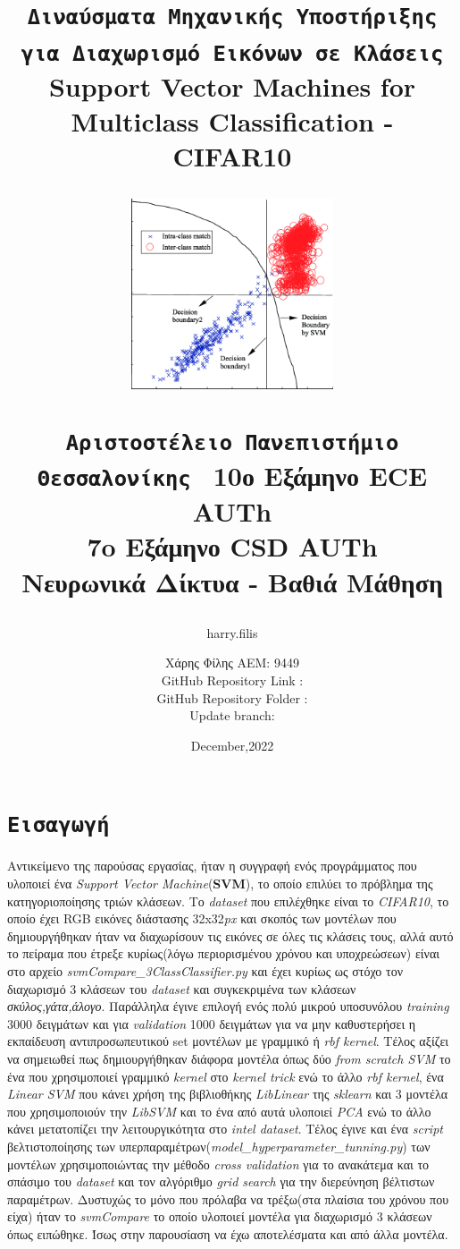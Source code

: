 \documentclass[10pt,a4paper,]{article}
\author{harry.filis}
\title{\texttt{\textlatin{Διναύσματα Μηχανικής Υποστήριξης για Διαχωρισμό Εικόνων σε Κλάσεις}} \\Support Vector Machines for Multiclass Classification - CIFAR10
\\
\begin{figure}[!htb]
    \centering
    \includegraphics[width = 6cm]{Decision-boundary-by-SVM-with-RBF-kernel-function.png}
    \label{linear_svm_classifier}%
\end{figure}
\newline
\texttt{Αριστοστέλειο Πανεπιστήμιο Θεσσαλονίκης \newline }
10ο Εξάμηνο ECE AUTh \\ 7o Εξάμηνο CSD AUTh \\ Νευρωνικά Δίκτυα - Βαθιά Μάθηση \\}
\author{\newline Χάρης Φίλης ΑΕΜ: 9449\\GitHub Repository Link : \href{https://github.com/ArtoriasAbyssslayer/DeepLearning-NNets}{\faGithubSquare} \\ GitHub Repository Folder : \href{https://github.com/ArtoriasAbyssslayer/DeepLearning-NNets/tree/master/SVM-Classification}{\faGithubSquare}
\\Update branch:\href{https://github.com/ArtoriasAbyssslayer/DeepLearning-NNets/tree/update_v2}{\faGithubSquare} }
\date{December,2022}
\begin{document}
\maketitle
\newpage
   \bgroup
    \tableofcontents
    \let\clearpage\relax
    \listoffigures
    \egroup
\clearpage
\section{\texttt{Εισαγωγή}}
Αντικείμενο της παρούσας εργασίας, ήταν η συγγραφή ενός προγράμματος
που υλοποιεί ένα \textit{Support Vector Machine}(\textbf{SVM}), το οποίο επιλύει το πρόβλημα της κατηγοριοποίησης τριών κλάσεων. Το \textit{dataset} που επιλέχθηκε είναι το \textit{CIFAR10}, το οποίο έχει RGB εικόνες διάστασης 32x32\textit{px} και σκοπός των μοντέλων που δημιουργήθηκαν ήταν να διαχωρίσουν τις εικόνες σε όλες τις κλάσεις τους, αλλά αυτό το πείραμα που έτρεξε κυρίως(λόγω περιορισμένου χρόνου και υποχρεώσεων) είναι στο αρχείο \textit{svmCompare\_3ClassClassifier.py} και έχει κυρίως ως στόχο τον διαχωρισμό 3 κλάσεων του \textit{dataset} και συγκεκριμένα των κλάσεων \textit{σκύλος,γάτα,άλογο}. Παράλληλα έγινε επιλογή ενός πολύ μικρού υποσυνόλου \textit{training} 3000 δειγμάτων και για \textit{validation} 1000 δειγμάτων για να μην καθυστερήσει η εκπαίδευση αντιπροσωπευτικού set μοντέλων με γραμμικό ή \textit{rbf kernel}. Τέλος αξίζει να σημειωθεί πως δημιουργήθηκαν διάφορα μοντέλα όπως δύο \textit{from scratch SVM} το ένα που χρησιμοποιεί γραμμικό \textit{kernel} στο \textit{kernel trick} ενώ το άλλο \textit{rbf kernel}, ένα \textit{Linear SVM} που κάνει χρήση της βιβλιοθήκης \textit{LibLinear} της \textit{sklearn} και 3 μοντέλα που χρησιμοποιούν την \textit{\textit{LibSVM}} και το ένα από αυτά υλοποιεί \textit{PCA} ενώ το άλλο κάνει μετατοπίζει την λειτουργικότητα στο \textit{intel dataset}. Τέλος έγινε και ένα \textit{script} βελτιστοποίησης των υπερπαραμέτρων(\textit{model\_hyperparameter\_tunning.py}) των μοντέλων χρησιμοποιώντας την μέθοδο \textit{cross validation} για το ανακάτεμα και το σπάσιμο του \textit{dataset} και τον αλγόριθμο \textit{grid search} για την διερεύνηση βέλτιστων παραμέτρων. Δυστυχώς το μόνο που πρόλαβα να τρέξω(στα πλαίσια του χρόνου που είχα) ήταν το \textit{svmCompare} το οποίο υλοποιεί μοντέλα για διαχωρισμό 3 κλάσεων όπως ειπώθηκε. Ίσως στην παρουσίαση να έχω αποτελέσματα και από άλλα μοντέλα.
\end{document}
